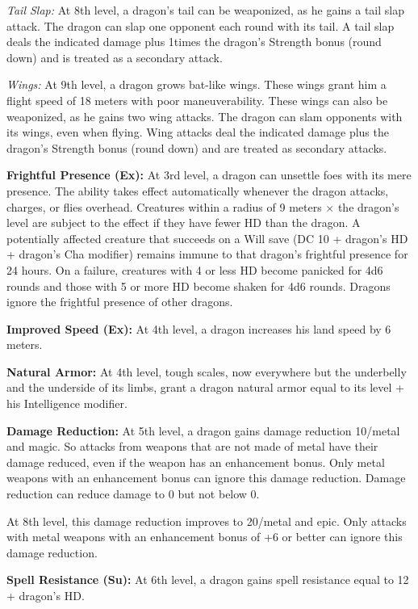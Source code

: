 {\textit{Tail Slap:} At 8th level, a dragon's tail can be weaponized, as he gains a tail slap attack. The dragon can slap one opponent each round with its tail. A tail slap deals the indicated damage plus 1\onehalf times the dragon's Strength bonus (round down) and is treated as a secondary attack.

\textit{Wings:} At 9th level, a dragon grows bat-like wings. These wings grant him a flight speed of 18 meters with poor maneuverability. These wings can also be weaponized, as he gains two wing attacks. The dragon can slam opponents with its wings, even when flying. Wing attacks deal the indicated damage plus \onehalf the dragon's Strength bonus (round down) and are treated as secondary attacks.

\textbf{Frightful Presence (Ex):} At 3rd level, a dragon can unsettle foes with its mere presence. The ability takes effect automatically whenever the dragon attacks, charges, or flies overhead. Creatures within a radius of 9 meters $\times$ the dragon's level are subject to the effect if they have fewer HD than the dragon. A potentially affected creature that succeeds on a Will save (DC 10 + dragon's HD + dragon's Cha modifier) remains immune to that dragon's frightful presence for 24 hours. On a failure, creatures with 4 or less HD become panicked for 4d6 rounds and those with 5 or more HD become shaken for 4d6 rounds. Dragons ignore the frightful presence of other dragons.

\textbf{Improved Speed (Ex):} At 4th level, a dragon increases his land speed by 6 meters.

\textbf{Natural Armor:} At 4th level, tough scales, now everywhere but the underbelly and the underside of its limbs, grant a dragon natural armor equal to its level + his Intelligence modifier.

\textbf{Damage Reduction:} At 5th level, a dragon gains damage reduction 10/metal and magic. So attacks from weapons that are not made of metal have their damage reduced, even if the weapon has an enhancement bonus. Only metal weapons with an enhancement bonus can ignore this damage reduction. Damage reduction can reduce damage to 0 but not below 0.

At 8th level, this damage reduction improves to 20/metal and epic. Only attacks with metal weapons with an enhancement bonus of +6 or better can ignore this damage reduction.

\textbf{Spell Resistance (Su):} At 6th level, a dragon gains spell resistance equal to 12 + dragon's HD.

}
